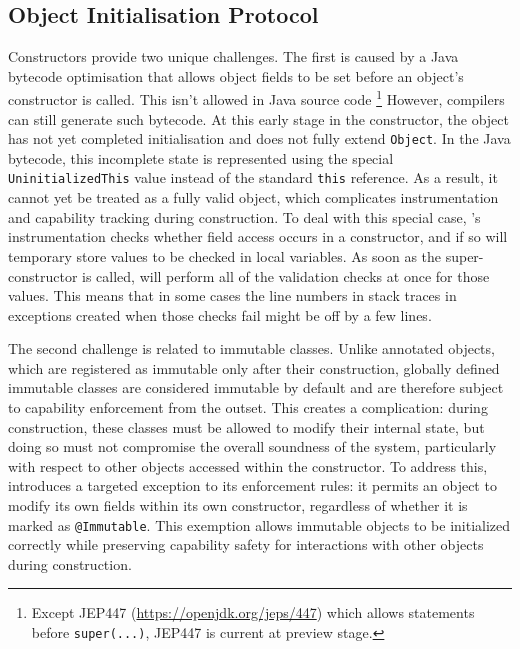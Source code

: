 

\subsection{Object Initialisation Protocol}

Constructors provide two unique challenges. The first is caused by a Java bytecode optimisation that allows object fields to be set before an object's constructor is called. This isn't allowed in Java source code \footnote{Except JEP447 (\url{https://openjdk.org/jeps/447}) which allows statements before \texttt{super(...)}, JEP447 is current at preview stage.} However, compilers  can still generate such bytecode. At this early stage in the constructor, the object has not yet completed initialisation and does not fully extend  \texttt{Object}. In the Java bytecode, this incomplete state is represented using the special \texttt{UninitializedThis} value instead of the standard \texttt{this} reference. As a result, it cannot yet be treated as a fully valid object, which complicates instrumentation and capability tracking during construction.
To deal with this special case, \jdala 's instrumentation checks whether field access occurs in a constructor, and if so will temporary store values to be checked in local variables. As soon as the super-constructor is called, \jdala will perform all of the validation checks at once for those values. This means that in some cases the line numbers in stack traces in \jdala exceptions created when those checks fail might be off by a few lines. 


The second challenge is related to immutable classes. Unlike annotated objects, which are registered as immutable only after their construction, globally defined immutable classes are considered immutable by default and are therefore subject to capability enforcement from the outset. This creates a complication: during construction, these classes must be allowed to modify their internal state, but doing so must not compromise the overall soundness of the system, particularly with respect to other objects accessed within the constructor.
To address this, \jdala introduces a targeted exception to its enforcement rules: it permits an object to modify its own fields within its own constructor, regardless of whether it is marked as \texttt{@Immutable}. This exemption allows immutable objects to be initialized correctly while preserving capability safety for interactions with other objects during construction.



